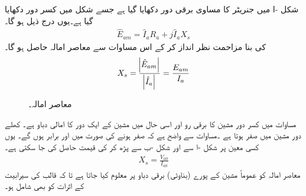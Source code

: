 شکل -ا  میں جنریٹر کا مساوی برقی دور دکھایا گیا ہے جسے  شکل   میں کسر دور دکھایا گیا ہے۔یوں درج ذیل ہو گا۔
\begin{align}
\hat{E}_{am}=\hat{I}_a R_a+j \hat{I}_a X_s
\end{align}
 کی بنا مزاحمت   نظر انداز کر کے اس مساوات سے معاصر امالہ حاصل ہو گا۔
\begin{align}\label{مساوات_معاصر_معاصر_امالہ_پیمائش}
X_s=\frac{\abs{\hat{E}_{am}}}{\abs{\hat{I}_a}}=\frac{E_{am}}{I_a}
\end{align}
%
\begin{figure}
\centering
\caption{معاصر امالہ۔}
\label{شکل_معاصر_امالہ_معاصر}
\end{figure}
مساوات  میں  کسر دور مشین کا برقی رو اور   اسی حال میں مشین کے ایک دور کا امالی دباو ہے۔ کھلے دور مشین میں  صفر ہوتا ہے ۔مساوات  سے واضح ہے کہ   صفر ہونے کی صورت میں   اور  برابر ہوں گے۔ یوں  کسی معین  پر شکل -ا سے   اور شکل -ب سے  پڑھ کر  کی قیمت حاصل کی جا سکتی ہے۔
\begin{align}
X_s=\frac{V_{a0}}{I_{a0}}
\end{align}
معاصر امالہ کو عموماً مشین کے پورے (بناوٹی) برقی دباو پر معلوم کیا جاتا ہے تا کہ قالب کی سیرابیت کے اثرات کو بھی شامل ہو۔

